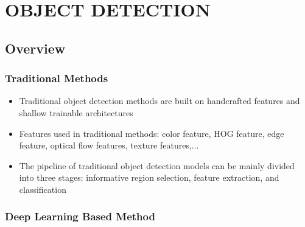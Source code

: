\chapter{OBJECT DETECTION}

\renewcommand{\headrulewidth}{0.5pt}
\renewcommand{\footrulewidth}{0.5pt}
\thispagestyle{plain}
\pagestyle{fancy}
\fancyhf{}
\raggedright
{}

\section{Overview}

    \subsection{Traditional Methods}
        \begin{itemize}
            \item Traditional object detection methods are built on handcrafted features and shallow trainable architectures 
            \item Features used in traditional methods: color feature, HOG feature, edge feature, optical flow features, texture features,...
            \item The pipeline of traditional object detection models can be mainly divided into three stages: informative region selection, feature extraction, and classification
        \end{itemize}
    
    \subsection{Deep Learning Based Method}

